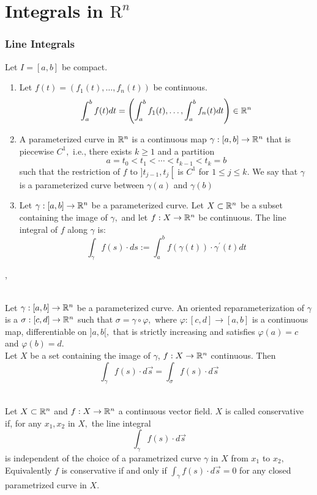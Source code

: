 \columnbreak
\part{Integrals in $\text{R}^n$}
\setcounter{section}{0}

\section{Line Integrals}

 Let $I=[a, b]$ be compact.
\begin{enumerate}
\item[(1)] Let $f(t)=\left(f_{1}(t), \ldots, f_{n}(t)\right) $
be continuous.
$$
\int_{a}^{b} f(t) d t=\left(\int_{a}^{b} f_{1}(t), \ldots, \int_{a}^{b} f_{n}(t) d t\right) \in \mathbb{R}^{n}
$$

\item[(2)] A parameterized curve in $\mathbb{R}^{n}$ is a continuous map $\gamma:[a, b] \rightarrow \mathbb{R}^{n}$ that is piecewise $C^{1},$ i.e., there exists $k \geqslant 1$ and a partition
$$
a=t_{0}<t_{1}<\cdots<t_{k-1}<t_{k}=b
$$
such that the restriction of $f$ to $] t_{j-1}, t_{j}\left[\right.$ is $C^{1}$ for $1 \leqslant j \leqslant k$. We say that $\gamma$ is a parameterized curve between $\gamma(a)$ and $\gamma(b)$

\item[(3)] Let $\gamma:[a, b] \rightarrow \mathbb{R}^{n}$ be a parameterized curve. Let $X \subset \mathbb{R}^{n}$ be a subset containing the image of $\gamma,$ and let $f: X \rightarrow \mathbb{R}^{n}$ be continuous. The line integral of $f$ along $\gamma$ is:
$$
\int_{\gamma} f(s) \cdot d s := \int_{a}^{b} f(\gamma(t)) \cdot \gamma^{\prime}(t) d t
$$
\end{enumerate}

\sep

\\ Let $\gamma:[a, b] \rightarrow \mathbb{R}^{n}$ be a parameterized curve. An oriented reparameterization of $\gamma$ is a  $\sigma:[c, d] \rightarrow \mathbb{R}^{n}$ such that $\sigma=\gamma \circ \varphi,$ where $\varphi:[c, d] \rightarrow[a, b]$ is a continuous map, differentiable on $] a, b[,$ that is strictly increasing and satisfies $\varphi(a)=c$ and $\varphi(b)=d$. \\
Let $X$ be a set containing the image of $\gamma$, $f: X \rightarrow \mathbb{R}^{n}$ continuous. Then
$$\int_{\gamma} f(s) \cdot d \vec{s}=\int_{\sigma} f(s) \cdot d \vec{s}$$

\\ Let $X \subset \mathbb{R}^{n}$ and $f: X \rightarrow \mathbb{R}^{n}$ a continuous vector field. $X$ is called conservative if, for any $x_{1}, x_{2}$ in $X,$ the line integral
$$\int_{\gamma} f(s) \cdot d \vec{s}$$
is independent of the choice of a parametrized curve $\gamma$ in $X$ from $x_{1}$ to $x_{2},$\\
Equivalently $f$ is conservative if and only if $\int_{\gamma} f(s) \cdot d \vec{s} = 0$ for any closed parametrized curve in $X$. \\

